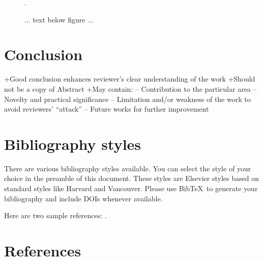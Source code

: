\documentclass[preprint]{elsarticle}
\begin{document}
\begin{figure}
\vspace{30mm} %
.
\caption{ ... text below figure ... }
\end{figure}

\section{Conclusion}

+Good conclusion enhances reviewer's clear understanding of the work 
+Should not be a copy of Abstract 
+May contain: 
– Contribution to the particular area 
– Novelty and practical significance 
– Limitation and/or weakness of the work to avoid
reviewers’ “attack” 
– Future works for further improvement 



\section{Bibliography styles}

There are various bibliography styles available. You can select the style of your choice in the preamble of this document. These styles are Elsevier styles based on standard styles like Harvard and Vancouver. Please use Bib\TeX\ to generate your bibliography and include DOIs whenever available.

Here are two sample references: \cite{Feynman1963118,Dirac1953888}.

\section*{References}


\end{document}
